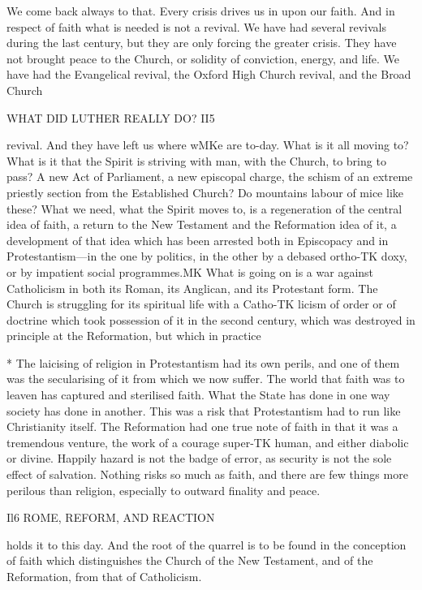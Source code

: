 \documentclass[12pt,a5paper,oneside]{book}
\begin{document}
We come back always to that. Every crisis drives 
us in upon our faith. And in respect of faith what 
is needed is not a revival. We have had several 
revivals during the last century, but they are only 
forcing the greater crisis. They have not brought 
peace to the Church, or solidity of conviction, energy, 
and life. We have had the Evangelical revival, the 
Oxford High Church revival, and the Broad Church 



WHAT DID LUTHER REALLY DO? II5 

revival. And they have left us where wMKe are to-day. 
What is it all moving to? What is it that the Spirit 
is striving with man, with the Church, to bring to 
pass? A new Act of Parliament, a new episcopal 
charge, the schism of an extreme priestly section from 
the Established Church? Do mountains labour of 
mice like these? What we need, what the Spirit 
moves to, is a regeneration of the central idea of faith, 
a return to the New Testament and the Reformation 
idea of it, a development of that idea which has been 
arrested both in Episcopacy and in Protestantism---in 
the one by politics, in the other by a debased ortho-TK
doxy, or by impatient social programmes.MK What is 
going on is a war against Catholicism in both its 
Roman, its Anglican, and its Protestant form. The 
Church is struggling for its spiritual life with a Catho-TK
licism of order or of doctrine which took possession 
of it in the second century, which was destroyed in 
principle at the Reformation, but which in practice 

* The laicising of religion in Protestantism had its own perils, 
and one of them was the secularising of it from which we now 
suffer. The world that faith was to leaven has captured and 
sterilised faith. What the State has done in one way society has 
done in another. This was a risk that Protestantism had to run like 
Christianity itself. The Reformation had one true note of faith in 
that it was a tremendous venture, the work of a courage super-TK
human, and either diabolic or divine. Happily hazard is not the 
badge of error, as security is not the sole effect of salvation. Nothing 
risks so much as faith, and there are few things more perilous than 
religion, especially to outward finality and peace. 



Il6 ROME, REFORM, AND REACTION 

holds it to this day. And the root of the quarrel is to 
be found in the conception of faith which distinguishes 
the Church of the New Testament, and of the 
Reformation, from that of Catholicism. 
\end{document}
